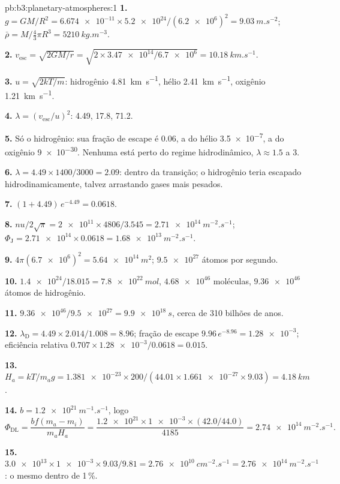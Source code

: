 \begin{solution}{pb:b3:planetary-atmospheres:1}
\textbf{1.} $g = GM/R^2 = \num{6.674e-11}\times\num{5.2e24}/(\num{6.2e6})^2 =
\qty{9.03}{m.s^{-2}}$; $\bar\rho = M/\tfrac43\pi R^3 = \qty{5210}{kg.m^{-3}}$.

\textbf{2.} $v_\mathrm{esc} = \sqrt{2GM/r} = \sqrt{2\times\num{3.47e14}/\num{6.7e6}}
= \qty{10.18}{km.s^{-1}}$.

\textbf{3.} $u = \sqrt{2kT/m}$: hidrogênio \qty{4.81}{km.s^{-1}}, hélio
\qty{2.41}{km.s^{-1}}, oxigênio \qty{1.21}{km.s^{-1}}.

\textbf{4.} $\lambda = (v_\mathrm{esc}/u)^2$: 4.49, 17.8, 71.2.

\textbf{5.} Só o hidrogênio: sua fração de escape é 0.06, a do hélio
\num{3.5e-7}, a do oxigênio \num{9e-30}. Nenhuma está perto do regime hidrodinâmico,
$\lambda \approx 1.5$ a 3.

\textbf{6.} $\lambda = 4.49\times1400/3000 = 2.09$: dentro da transição;
o hidrogênio teria escapado hidrodinamicamente, talvez arrastando
gases mais pesados.

\textbf{7.} $(1 + 4.49)\,e^{-4.49} = 0.0618$.

\textbf{8.} $n u/2\sqrt\pi = \num{2e11}\times4806/3.545 = \qty{2.71e14}{m^{-2}.s^{-1}}$;
$\Phi_\mathrm J = \num{2.71e14}\times0.0618 = \qty{1.68e13}{m^{-2}.s^{-1}}$.

\textbf{9.} $4\pi(\num{6.7e6})^2 = \qty{5.64e14}{m^2}$; $\num{9.5e27}$ átomos por
segundo.

\textbf{10.} $\num{1.4e24}/18.015 = \qty{7.8e22}{mol}$, $\num{4.68e46}$ moléculas,
$\num{9.36e46}$ átomos de hidrogênio.

\textbf{11.} $\num{9.36e46}/\num{9.5e27} = \qty{9.9e18}{s}$, cerca de 310 bilhões
de anos.

\textbf{12.} $\lambda_\mathrm D = 4.49\times2.014/1.008 = 8.96$; fração de escape
$9.96\,e^{-8.96} = \num{1.28e-3}$; eficiência relativa $0.707\times
\num{1.28e-3}/0.0618 = 0.015$.

\textbf{13.} $H_a = kT/m_a g = \num{1.381e-23}\times200/(44.01\times\num{1.661e-27}
\times9.03) = \qty{4.18}{km}$.

\textbf{14.} $b = \qty{1.2e21}{m^{-1}.s^{-1}}$, logo
\[
\Phi_\mathrm{DL} = \frac{b f(m_a - m_i)}{m_a H_a}
= \frac{\num{1.2e21}\times\num{1e-3}\times(42.0/44.0)}{4185}
= \qty{2.74e14}{m^{-2}.s^{-1}}.
\]

\textbf{15.} $\num{3.0e13}\times\num{1e-3}\times9.03/9.81 =
\qty{2.76e10}{cm^{-2}.s^{-1}} = \qty{2.76e14}{m^{-2}.s^{-1}}$: o mesmo
dentro de 1\,\%.


\end{solution}
